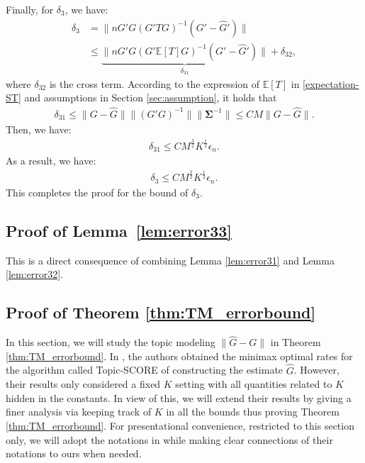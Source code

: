 \documentclass[preprint,11pt]{article}
\newcommand{\mbb}{\mathbb}
\numberwithin{equation}{section}
\begin{document}
Finally, for $\delta_3$, we have:
\begin{align*}
    \delta_3&=\|nG'G(G' TG)^{-1}(G'-\widehat{G}')\|\\
    &\le \underbrace{\|nG'G(G' \mbb{E}[T]G)^{-1}(G'-\widehat{G}')\|}_{\delta_{31}}+\delta_{32},
\end{align*}
where $\delta_{32}$ is the cross term. According to the expression of $\mathbb{E}[T]$ in \eqref{expectation-ST} and assumptions in Section \ref{sec:assumption}, it holds that
\begin{align*}
    \delta_{31}\le \|G-\widehat{G}\|\|(G'G)^{-1}\|\|\bm{\Sigma}^{-1}\|\le CM\|G-\widehat{G}\|.
\end{align*}
Then, we have:
\begin{align*}
    \delta_{31}\le CM^{\frac{3}{2}}K^{\frac{1}{2}}\epsilon_n.
\end{align*}
As a result, we have:
\begin{align*}
    \delta_{3}\le CM^{\frac{3}{2}}K^{\frac{1}{2}}\epsilon_n.
\end{align*}
This completes the proof for the bound of $\delta_3$.

\subsection{Proof of Lemma~\ref{lem:error33}}
This is a direct consequence of combining Lemma \ref{lem:error31} and Lemma \ref{lem:error32}.
\fi

%
%

\subsection{Proof of Theorem \ref{thm:TM_errorbound}}
In this section, we will study the topic modeling $\|\widehat{G}-G\|$ in Theorem \ref{thm:TM_errorbound}. In \cite{ke2024entry}, the authors obtained the minimax optimal rates for the algorithm called Topic-SCORE of constructing the estimate $\widehat{G}$. However, their results only considered a fixed $K$ setting with all quantities related to $K$ hidden in the constants. In view of this, we will extend their results by giving a finer analysis via keeping track of $K$ in all the bounds thus proving Theorem \ref{thm:TM_errorbound}. For presentational convenience, restricted to this section only, we will adopt the notations in \cite{ke2024entry} while making clear connections of their notations to ours when needed.
\end{document}
